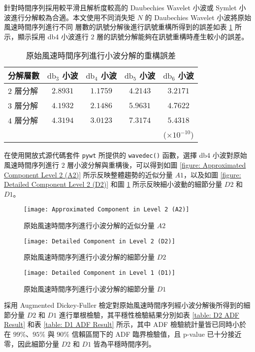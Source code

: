 針對時間序列採用較平滑且解析度較高的 Daubechies Wavelet 小波或 Symlet 小波進行分解較為合適。本文使用不同消失矩 $N$ 的 Daubechies Wavelet 小波將原始風速時間序列進行不同 層數的訊號分解後進行訊號重構所得到的誤差如表 \ref{table: Wavelet Reconstruction Error} 所示，顯示採用 db4 小波進行 $2$ 層的訊號分解能夠在訊號重構時產生較小的誤差。

\begin{table}[htp]
  \centering
  \caption[原始風速時間序列進行小波分解的重構誤差]{原始風速時間序列進行小波分解的重構誤差}
  \begin{tabular*}{0.65\textwidth}{lcccc}
    \toprule
    \textbf{分解層數} & $\text{db}_3$ \textbf{小波} & $\text{db}_4$ \textbf{小波} & $\text{db}_5$ \textbf{小波} & $\text{db}_6$ \textbf{小波} \\
    \midrule
    $2$ 層分解 & $2.8931$ & $1.1759$ & $4.2143$ & $3.2171$ \\
    $3$ 層分解 & $4.1932$ & $2.1486$ & $5.9631$ & $4.7622$ \\
    $4$ 層分解 & $4.3194$ & $3.0123$ & $7.3174$ & $5.4318$ \\
    \bottomrule
    & & & & ($\times 10^{-10}$)
  \end{tabular*}
  \label{table: Wavelet Reconstruction Error}
\end{table}

在使用開放式源代碼套件 \texttt{pywt} 所提供的 \texttt{wavedec()} 函數，選擇 db4 小波對原始風速時間序列進行 $2$ 層小波分解與重構後，可以得到如圖 \ref{figure: Approximated Component Level 2 (A2)} 所示反映整體趨勢的近似分量 $A1$，以及如圖 \ref{figure: Detailed Component Level 2 (D2)} 和圖 \ref{figure: Detailed Component Level 1 (D1)} 所示反映細小波動的細節分量 $D2$ 和 $D1$。

\begin{figure}[hbp]
  \centering
  \texttt{[image: Approximated Component in Level 2 (A2)]}
  \caption{原始風速時間序列進行小波分解的近似分量 $A2$}
  \label{figure: Approximated Component Level 2 (A2)}
  \texttt{[image: Detailed Component in Level 2 (D2)]}
  \caption{原始風速時間序列進行小波分解的細節分量 $D2$}
  \label{figure: Detailed Component Level 2 (D2)}
  \texttt{[image: Detailed Component in Level 1 (D1)]}
  \caption{原始風速時間序列進行小波分解的細節分量 $D1$}
  \label{figure: Detailed Component Level 1 (D1)}
\end{figure}

採用 Augmented Dickey-Fuller 檢定對原始風速時間序列經小波分解後所得到的細節分量 $D2$ 和 $D1$ 進行單根檢驗，其平穩性檢驗結果分別如表 \ref{table: D2 ADF Result} 和表 \ref{table: D1 ADF Result} 所示，其中 ADF 檢驗統計量皆已同時小於在 $99\%$、$95\%$ 與 $90\%$ 信賴區間下的 ADF 臨界檢驗值，且 p-value 已十分接近零，因此細節分量 $D2$ 和 $D1$ 皆為平穩時間序列。

